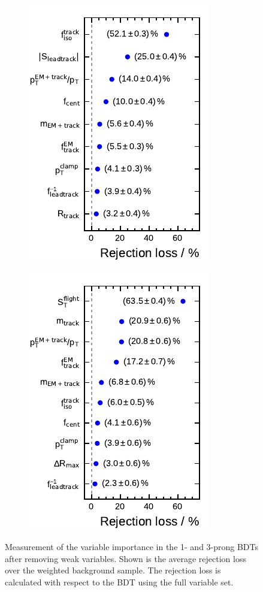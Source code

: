 \begin{figure}[htb]
  \centering
  \begin{subfigure}[t]{0.48\textwidth}
    \centering
    \includegraphics{./figures/bdt_perf/var_importance/1p_iter2.pdf}
  \end{subfigure}\hfill
  \begin{subfigure}[t]{0.48\textwidth}
    \centering
    \includegraphics{./figures/bdt_perf/var_importance/3p_iter3.pdf}
  \end{subfigure}
  \caption{Measurement of the variable importance in the 1- and 3-prong BDTs
    after removing weak variables. Shown is the average rejection loss over the
    weighted background sample. The rejection loss is calculated with respect to
    the BDT using the full variable set.}
  \label{fig:variable_importance_final}
\end{figure}


